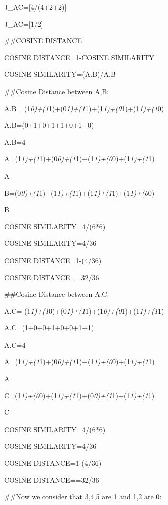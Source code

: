 \documentclass[
]{article}
\begin{document}
J\_AC={[}4/(4+2+2){]}

J\_AC={[}1/2{]}

\#\#COSINE DISTANCE

COSINE DISTANCE=1-COSINE SIMILARITY

COSINE
SIMILARITY=(A.B)/\textbar\textbar A\textbar\textbar.\textbar\textbar B\textbar\textbar{}

\#\#Cosine Distance between A,B:

A.B= (1\emph{0)+(1}1)+(0\emph{1)+(1}1)+(1\emph{1)+(0}1)+(1\emph{1)+(1}0)

A.B=(0+1+0+1+1+0+1+0)

A.B=4

\textbar\textbar A\textbar\textbar=(1\emph{1)+(1}1)+(0\emph{0)+(1}1)+(1\emph{1)+(0}0)+(1\emph{1)+(1}1)

\textbar\textbar A\textbar{}

\textbar\textbar B\textbar\textbar=(0\emph{0)+(1}1)+(1\emph{1)+(1}1)+(1\emph{1)+(1}1)+(1\emph{1)+(0}0)

\textbar\textbar B\textbar{}

COSINE SIMILARITY=4/(6*6)

COSINE SIMILARITY=4/36

COSINE DISTANCE=1-(4/36)

COSINE DISTANCE==32/36

\#\#Cosine Distance between A,C:

A.C= (1\emph{1)+(1}0)+(0\emph{1)+(1}1)+(1\emph{0)+(0}1)+(1\emph{1)+(1}1)

A.C=(1+0+0+1+0+0+1+1)

A.C=4

\textbar\textbar A\textbar\textbar=(1\emph{1)+(1}1)+(0\emph{0)+(1}1)+(1\emph{1)+(0}0)+(1\emph{1)+(1}1)

\textbar\textbar A\textbar{}

\textbar\textbar C\textbar\textbar=(1\emph{1)+(0}0)+(1\emph{1)+(1}1)+(0\emph{0)+(1}1)+(1\emph{1)+(1}1)

\textbar\textbar C\textbar{}

COSINE SIMILARITY=4/(6*6)

COSINE SIMILARITY=4/36

COSINE DISTANCE=1-(4/36)

COSINE DISTANCE==32/36

\#\#Now we consider that 3,4,5 are 1 and 1,2 are 0:
\end{document}
